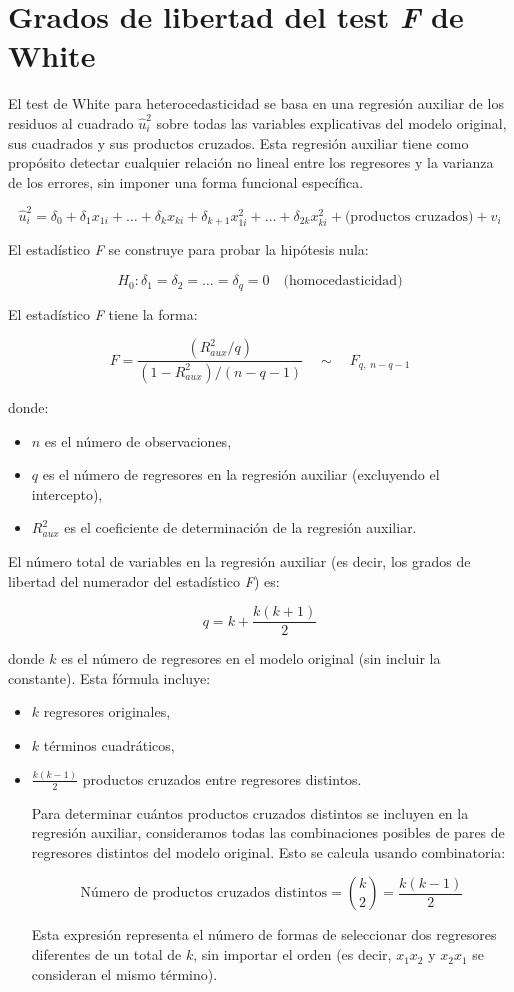 \documentclass[12pt]{article}
\begin{document}
\section*{Grados de libertad del test \textit{F} de White}

El test de White para heterocedasticidad se basa en una regresión auxiliar de los residuos al cuadrado $\hat{u}_i^2$ sobre todas las variables explicativas del modelo original, sus cuadrados y sus productos cruzados. Esta regresión auxiliar tiene como propósito detectar cualquier relación no lineal entre los regresores y la varianza de los errores, sin imponer una forma funcional específica.

\[
\hat{u}_i^2 = \delta_0 + \delta_1 x_{1i} + \dots + \delta_k x_{ki} + \delta_{k+1} x_{1i}^2 + \dots + \delta_{2k} x_{ki}^2 + \text{(productos cruzados)} + v_i
\]

El estadístico \textit{F} se construye para probar la hipótesis nula:

\[
H_0: \delta_1 = \delta_2 = \dots = \delta_q = 0 \quad \text{(homocedasticidad)}
\]

El estadístico \textit{F} tiene la forma:

\[
F = \frac{(R_{aux}^2 / q)}{(1 - R_{aux}^2) / (n - q - 1)} \quad \sim \quad F_{q,\;n - q - 1}
\]

donde:

\begin{itemize}
  \item $n$ es el número de observaciones,
  \item $q$ es el número de regresores en la regresión auxiliar (excluyendo el intercepto),
  \item $R_{aux}^2$ es el coeficiente de determinación de la regresión auxiliar.
\end{itemize}

El número total de variables en la regresión auxiliar (es decir, los grados de libertad del numerador del estadístico \textit{F}) es:

\[
q = k + \frac{k(k+1)}{2}
\]

donde $k$ es el número de regresores en el modelo original (sin incluir la constante). Esta fórmula incluye:

\begin{itemize}
  \item $k$ regresores originales,
  \item $k$ términos cuadráticos,
  \item $\frac{k(k-1)}{2}$ productos cruzados entre regresores distintos.

  Para determinar cuántos productos cruzados distintos se incluyen en la regresión auxiliar, consideramos todas las combinaciones posibles de pares de regresores distintos del modelo original. Esto se calcula usando combinatoria:

\[
\text{Número de productos cruzados distintos} = \binom{k}{2} = \frac{k(k - 1)}{2}
\]

Esta expresión representa el número de formas de seleccionar dos regresores diferentes de un total de $k$, sin importar el orden (es decir, $x_1x_2$ y $x_2x_1$ se consideran el mismo término).

\end{itemize}
\end{document}
